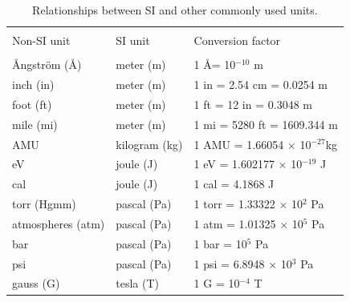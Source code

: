 \documentclass[byrevtex,amssymb,aps,pra,floatfix,letterpaper]{revtex4}
\begin{document}
\begin{table}[!htp]
\caption{Relationships between SI and other commonly used units.}
\begin{tabular}{l@{\extracolsep{1cm}}l@{\extracolsep{2cm}}l}
 & & \\
Non-SI unit & SI unit & Conversion factor\\
\cline{1-3}\\
\AA ngstr\"om (\AA) & meter (m) & 1 \AA = 10$^{-10}$ m\\
inch (in)  &  meter (m)  &   1 in = 2.54 cm = 0.0254 m\\
foot (ft)  &  meter (m)  &   1 ft = 12 in = 0.3048 m\\
mile (mi)  &  meter (m)  &   1 mi = 5280 ft = 1609.344 m\\
AMU        &  kilogram (kg) & 1 AMU = 1.66054 $\times$ 10$^{-27}$kg\\
eV    &       joule (J) & 1 eV = 1.602177 $\times$ 10$^{-19}$ J\\
cal   &       joule (J) &  1 cal = 4.1868 J\\
torr (Hgmm) &       pascal (Pa) & 1 torr = 1.33322 $\times$ 10$^2$ Pa\\
atmospheres (atm) & pascal (Pa) & 1 atm = 1.01325 $\times$ 10$^5$ Pa\\
bar      &         pascal (Pa) & 1 bar = 10$^5$ Pa\\
psi      &        pascal (Pa) & 1 psi = 6.8948 $\times$ 10$^3$ Pa\\
gauss (G)  &       tesla (T) & 1 G = 10$^{-4}$ T\\
\end{tabular}
\label{table3}
\end{table}
\end{document}
